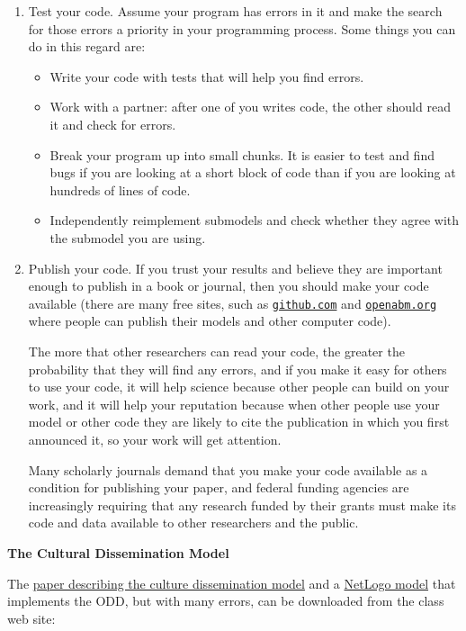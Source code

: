\documentclass[
]{article}
\providecommand{\tightlist}{%
  \setlength{\itemsep}{0pt}\setlength{\parskip}{0pt}}
\begin{document}
\begin{enumerate}
\def\labelenumi{\arabic{enumi}.}
\item
  Test your code. Assume your program has errors in it and make the
  search for those errors a priority in your programming process. Some
  things you can do in this regard are:

  \begin{itemize}
  \tightlist
  \item
    Write your code with tests that will help you find errors.
  \item
    Work with a partner: after one of you writes code, the other should
    read it and check for errors.
  \item
    Break your program up into small chunks. It is easier to test and
    find bugs if you are looking at a short block of code than if you
    are looking at hundreds of lines of code.
  \item
    Independently reimplement submodels and check whether they agree
    with the submodel you are using.
  \end{itemize}
\item
  Publish your code. If you trust your results and believe they are
  important enough to publish in a book or journal, then you should make
  your code available (there are many free sites, such as
  \href{https://github.com}{\texttt{github.com}} and
  \href{https://openabm.org}{\texttt{openabm.org}} where people can
  publish their models and other computer code).

  The more that other researchers can read your code, the greater the
  probability that they will find any errors, and if you make it easy
  for others to use your code, it will help science because other people
  can build on your work, and it will help your reputation because when
  other people use your model or other code they are likely to cite the
  publication in which you first announced it, so your work will get
  attention.

  Many scholarly journals demand that you make your code available as a
  condition for publishing your paper, and federal funding agencies are
  increasingly requiring that any research funded by their grants must
  make its code and data available to other researchers and the public.
\end{enumerate}

\textbf{The Cultural Dissemination Model}

The
\href{//files/models/chapter_06/axelrod_culture_dissemination_1997.pdf}{paper
describing the culture dissemination model} and a
\href{/files/models/chapter_06/CultureDissemination_Untested.nlogo}{NetLogo
model} that implements the ODD, but with many errors, can be downloaded
from the class web site:
\end{document}
